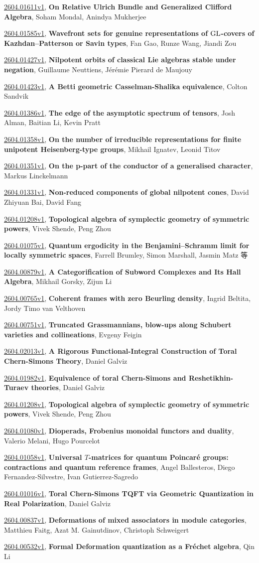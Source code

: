 \documentclass[9pt, a4paper]{article}
\theoremstyle{plain}
\theoremstyle{definition}
\theoremstyle{remark}
\newcommand{\arxiv}[3]{\href{https://arxiv.org/abs/#1}{#1}, \textbf{\textcolor{arxivblue}{#2}}, #3}
\begin{document}
\arxiv{2604.01611v1}{On Relative Ulrich Bundle and Generalized Clifford Algebra}{Soham Mondal, Anindya Mukherjee}

\arxiv{2604.01585v1}{Wavefront sets for genuine representations of $\rm GL$-covers of Kazhdan--Patterson or Savin types}{Fan Gao, Runze Wang, Jiandi Zou}

\arxiv{2604.01427v1}{Nilpotent orbits of classical Lie algebras stable under negation}{Guillaume Neuttiens, Jérémie Pierard de Maujouy}

\arxiv{2604.01423v1}{A Betti geometric Casselman-Shalika equivalence}{Colton Sandvik}

\arxiv{2604.01386v1}{The edge of the asymptotic spectrum of tensors}{Josh Alman, Baitian Li, Kevin Pratt}

\arxiv{2604.01358v1}{On the number of irreducible representations for finite unipotent Heisenberg-type groups}{Mikhail Ignatev, Leonid Titov}

\arxiv{2604.01351v1}{On the p-part of the conductor of a generalised character}{Markus Linckelmann}

\arxiv{2604.01331v1}{Non-reduced components of global nilpotent cones}{David Zhiyuan Bai, David Fang}

\arxiv{2604.01208v1}{Topological algebra of symplectic geometry of symmetric powers}{Vivek Shende, Peng Zhou}

\arxiv{2604.01075v1}{Quantum ergodicity in the Benjamini--Schramm limit for locally symmetric spaces}{Farrell Brumley, Simon Marshall, Jasmin Matz 等}

\arxiv{2604.00879v1}{A Categorification of Subword Complexes and Its Hall Algebra}{Mikhail Gorsky, Zijun Li}

\arxiv{2604.00765v1}{Coherent frames with zero Beurling density}{Ingrid Beltita, Jordy Timo van Velthoven}

\arxiv{2604.00751v1}{Truncated Grassmannians, blow-ups along Schubert varieties and collineations}{Evgeny Feigin}

\arxiv{2604.02013v1}{A Rigorous Functional-Integral Construction of Toral Chern-Simons Theory}{Daniel Galviz}

\arxiv{2604.01982v1}{Equivalence of toral Chern-Simons and Reshetikhin-Turaev theories}{Daniel Galviz}

\arxiv{2604.01208v1}{Topological algebra of symplectic geometry of symmetric powers}{Vivek Shende, Peng Zhou}

\arxiv{2604.01080v1}{Dioperads, Frobenius monoidal functors and duality}{Valerio Melani, Hugo Pourcelot}

\arxiv{2604.01058v1}{Universal $T$-matrices for quantum Poincaré groups: contractions and quantum reference frames}{Angel Ballesteros, Diego Fernandez-Silvestre, Ivan Gutierrez-Sagredo}

\arxiv{2604.01016v1}{Toral Chern-Simons TQFT via Geometric Quantization in Real Polarization}{Daniel Galviz}

\arxiv{2604.00837v1}{Deformations of mixed associators in module categories}{Matthieu Faitg, Azat M. Gainutdinov, Christoph Schweigert}

\arxiv{2604.00532v1}{Formal Deformation quantization as a Fréchet algebra}{Qin Li}

\end{document}
